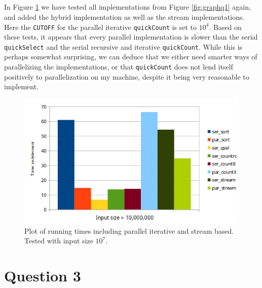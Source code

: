 \documentclass[a5paper]{article}
\begin{document}
\subsection{} 
In Figure \ref{fig:graphq2} we have tested all implementations from Figure \ref{fig:graphq1} again, and added the hybrid implementation as well as the stream implementations. Here the \texttt{CUTOFF} for the parallel iterative \texttt{quickCount} is set to $10^4$. Based on these tests, it appears that every parallel implementation is slower than the serial \texttt{quickSelect} and the serial recursive and iterative \texttt{quickCount}. While this is perhaps somewhat surprising, we can deduce that we either need smarter ways of parallelizing the implementations, or that \texttt{quickCount} does not lend itself positively to parallelization on my machine, despite it being very reasonable to implement.
\begin{figure}[ht!]
    \centering
    \noindent\includegraphics[scale=0.45]{res/graph_q2.png}
    \caption{Plot of running times including parallel iterative and stream based. Tested with input size $10^7$.}
    \label{fig:graphq2}
\end{figure}

\section{Question 3}
\end{document}

